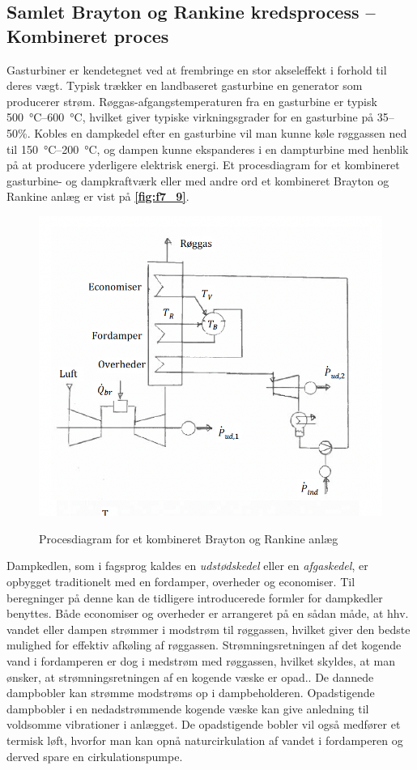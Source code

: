 \subsection{Samlet Brayton og Rankine kredsprocess -- Kombineret proces}
Gasturbiner er kendetegnet ved at frembringe en stor akseleffekt i forhold til deres vægt. Typisk trækker en landbaseret gasturbine en generator som producerer strøm. Røggas-afgangstemperaturen fra en gasturbine er typisk \qty{500}{\celsius}--\qty{600}{\celsius}, hvilket giver typiske virkningsgrader for en gasturbine på 35--50\%. Kobles en dampkedel efter en gasturbine vil man kunne køle røggassen ned til \qty{150}{\celsius}--\qty{200}{\celsius}, og dampen kunne ekspanderes i en dampturbine med henblik på at producere yderligere elektrisk energi. Et procesdiagram for et kombineret gasturbine- og dampkraftværk eller med andre ord et kombineret Brayton og Rankine anlæg er vist på \textbf{\autoref{fig:f7_9}}. 

\begin{figure} [ht]
  \centering
  \caption{Procesdiagram for et kombineret Brayton og Rankine anlæg}
  \includegraphics[width=0.5\linewidth]{./figures/f7_9.png}
  \label{fig:f7_9}
\end{figure}

Dampkedlen, som i fagsprog kaldes en \textit{udstødskedel} eller en \textit{afgaskedel}, er opbygget traditionelt med en fordamper, overheder og economiser. Til beregninger på denne kan de tidligere introducerede formler for dampkedler benyttes. Både economiser og overheder er arrangeret på en sådan måde, at hhv. vandet eller dampen strømmer i modstrøm til røggassen, hvilket giver den bedste mulighed for effektiv afkøling af røggassen. Strømningsretningen af det kogende vand i fordamperen er dog i medstrøm med røggassen, hvilket skyldes, at man ønsker, at strømningsretningen af en kogende væske er opad.. De dannede dampbobler kan strømme modstrøms op i dampbeholderen. Opadstigende dampbobler i en nedadstrømmende kogende væske kan give anledning til voldsomme vibrationer i anlægget. De opadstigende bobler vil også medfører et termisk løft, hvorfor man kan opnå naturcirkulation af vandet i fordamperen og derved spare en cirkulationspumpe. 

